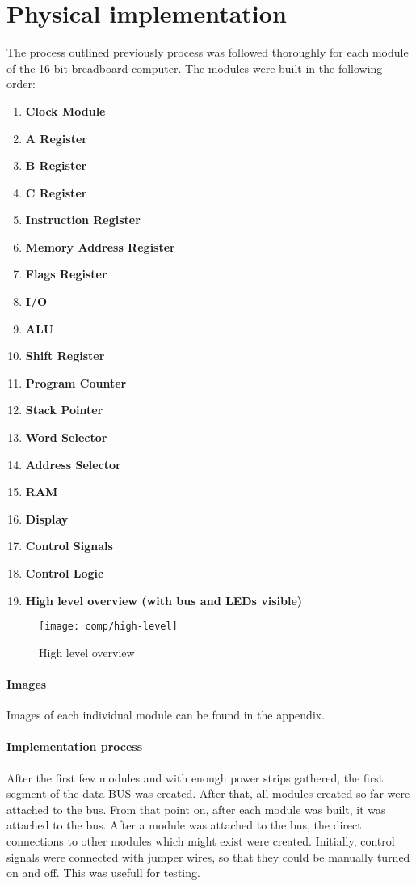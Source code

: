 \section{Physical implementation}
The process outlined previously process was followed thoroughly for each module of the 16-bit
breadboard computer. The modules were built in the following order:
\begin{enumerate}
  \item \textbf{Clock Module}
  \item \textbf{A Register}
  \item \textbf{B Register}
  \item \textbf{C Register}
  \item \textbf{Instruction Register}
  \item \textbf{Memory Address Register}
  \item \textbf{Flags Register}
  \item \textbf{I/O}
  \item \textbf{ALU}
  \item \textbf{Shift Register}
  \item \textbf{Program Counter}
  \item \textbf{Stack Pointer}
  \item \textbf{Word Selector}
  \item \textbf{Address Selector}
  \item \textbf{RAM}
  \item \textbf{Display}
  \item \textbf{Control Signals}
  \item \textbf{Control Logic}
  \item \textbf{High level overview (with bus and LEDs visible)}
\end{enumerate}

\begin{figure}[h]
  \centering
  \texttt{[image: comp/high-level]}
  \caption{High level overview}
\end{figure}
\clearpage

\paragraph{Images} Images of each individual module can
be found in the appendix.



\paragraph{Implementation process}
After the first few modules and with enough power strips gathered, the first segment of the data
BUS was created. After that, all modules created so far were attached to the bus. From that point
on, after each module was built, it was attached to the bus. After a module was attached to the
bus, the direct connections to other modules which might exist were created. Initially, control
signals were connected with jumper wires, so that they could be manually turned on and off.
This was usefull for testing.


